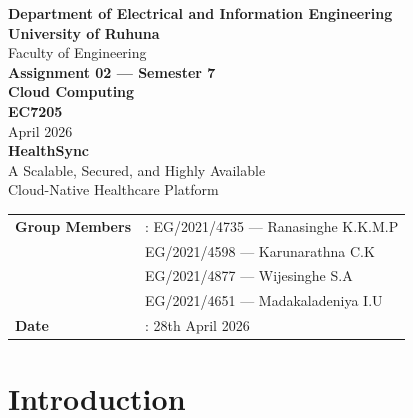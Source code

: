 \documentclass[12pt,a4paper]{article}
\begin{document}
\begin{titlepage}
    \centering
    
    \vspace*{1cm}
    {\LARGE \textbf{Department of Electrical and Information Engineering}}\\[0.4cm]
    {\Large \textbf{University of Ruhuna}}\\[0.3cm]
    {\large Faculty of Engineering}\\[1.5cm]
    
    {\Large \textbf{Assignment 02 --- Semester 7}}\\[0.2cm]
    {\large \textbf{Cloud Computing}}\\[0.2cm]
    {\large \textbf{EC7205}}\\[0.15cm]
    {\normalsize April 2026}\\[2cm]

    {\LARGE \textbf{HealthSync}}\\[0.3cm]
    {\large A Scalable, Secured, and Highly Available\\Cloud-Native Healthcare Platform}\\[2.5cm]

    \begin{tabular}{@{}l l}
        \textbf{Group Members} & : EG/2021/4735 --- Ranasinghe K.K.M.P\\
                                & \phantom{: }EG/2021/4598 --- Karunarathna C.K \\
                                & \phantom{: }EG/2021/4877 --- Wijesinghe S.A \\
                                & \phantom{: }EG/2021/4651 --- Madakaladeniya I.U \\[0.3cm]
        \textbf{Date}          & : 28th April 2026 \\
    \end{tabular}

    \vfill
\end{titlepage}

\section{Introduction}
\end{document}
